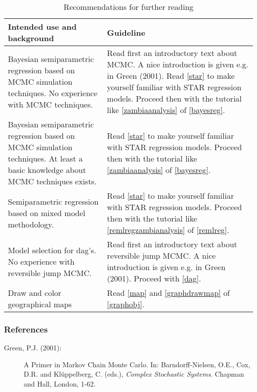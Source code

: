 \begin{table}[ht] \footnotesize
\begin{center}
\begin{tabular}{ |p{7cm}|p{8.5cm}|}
\hline
{\bf Intended use and background} & {\bf Guideline} \\
\hline\hline Bayesian semiparametric regression based on MCMC
simulation techniques. No experience with MCMC techniques. & Read
first an introductory text about MCMC. A nice introduction is
given e.g. in Green (2001). Read \autoref{star} to make yourself
familiar with STAR regression models.
Proceed then with the tutorial like \autoref{zambiaanalysis} of \autoref{bayesreg}. \\
\hline Bayesian semiparametric regression based on MCMC simulation
techniques. At least a basic knowledge about MCMC techniques
exists. & Read \autoref{star} to make yourself familiar
with STAR regression models. Proceed then with the tutorial like \autoref{zambiaanalysis} of \autoref{bayesreg}. \\
\hline Semiparametric regression based on mixed model methodology.
& Read \autoref{star} to make yourself familiar with STAR
regression models. Proceed then with the tutorial like
\autoref{remlregzambianalysis} of \autoref{remlreg}. \\
\hline Model selection for dag's. No experience with reversible
jump MCMC. & Read first an introductory text about reversible jump
MCMC. A nice introduction is
given e.g. in Green (2001). Proceed with \autoref{dag}. \\
\hline
Draw and color geographical maps & Read \autoref{map} and \autoref{graphdrawmap} of \autoref{graphobj}. \\
\hline
\end{tabular}
{\em \caption {\label{recomm} Recommendations for further
reading}}
\end{center}
\end{table}

\subsubsection*{References}

\begin{description}
\item[Green, P.J. (2001):] A Primer in Markov Chain Monte Carlo. In: Barndorff-Nielsen, O.E.,
Cox, D.R. and Kl{\"u}ppelberg, C. (eds.), {\em Complex Stochastic
Systems}. Chapman and Hall, London, 1-62.
\end{description}
